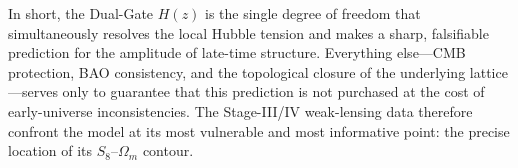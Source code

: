 In short, the Dual-Gate \(H(z)\) is the single degree of freedom that simultaneously resolves the local Hubble tension and makes a sharp, falsifiable prediction for the amplitude of late-time structure. Everything else—CMB protection, BAO consistency, and the topological closure of the underlying lattice—serves only to guarantee that this prediction is not purchased at the cost of early-universe inconsistencies. The Stage-III/IV weak-lensing data therefore confront the model at its most vulnerable and most informative point: the precise location of its \(S_8\)–\(\Omega_m\) contour.

